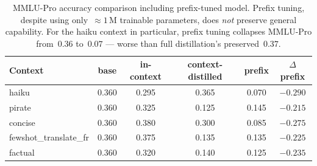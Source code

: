 \begin{table}[t]
\centering
\caption{MMLU-Pro accuracy comparison including prefix-tuned model.
Prefix tuning, despite using only~$\approx 1$\,M trainable parameters,
does \emph{not} preserve general capability. For the haiku context in
particular, prefix tuning collapses MMLU-Pro from~$0.36$ to~$0.07$ ---
worse than full distillation's preserved~$0.37$.}
\label{tab:mmlu_prefix}
\small
\begin{tabular}{lccccc}
\toprule
Context & base & in-context & context-distilled & prefix & $\Delta$prefix \\
\midrule
haiku                  & 0.360 & 0.295 & 0.365 & 0.070 & $\mathbf{-0.290}$ \\
pirate                 & 0.360 & 0.325 & 0.125 & 0.145 & $-0.215$ \\
concise                & 0.360 & 0.380 & 0.300 & 0.085 & $\mathbf{-0.275}$ \\
fewshot\_translate\_fr & 0.360 & 0.375 & 0.135 & 0.135 & $-0.225$ \\
factual                & 0.360 & 0.320 & 0.140 & 0.125 & $-0.235$ \\
\bottomrule
\end{tabular}
\end{table}
